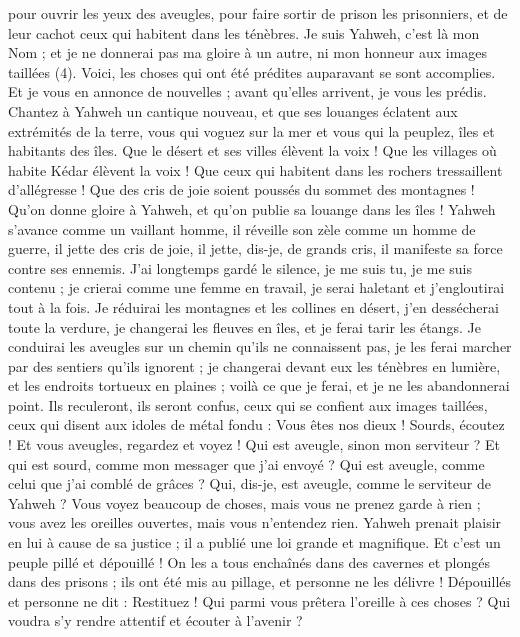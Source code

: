 \begin{multicols}{2}
pour ouvrir les yeux des aveugles, pour faire sortir de prison les prisonniers, et de leur cachot ceux qui habitent dans les ténèbres.
Je suis Yahweh, c'est là mon Nom ; et je ne donnerai pas ma gloire à un autre, ni mon honneur aux images taillées (4).
Voici, les choses qui ont été prédites auparavant se sont accomplies. Et je vous en annonce de nouvelles ; avant qu’elles arrivent, je vous les prédis.
Chantez à Yahweh un cantique nouveau, et que ses louanges éclatent aux extrémités de la terre, vous qui voguez sur la mer et vous qui la peuplez, îles et habitants des îles.
Que le désert et ses villes élèvent la voix ! Que les villages où habite Kédar élèvent la voix ! Que ceux qui habitent dans les rochers tressaillent d’allégresse ! Que des cris de joie soient poussés du sommet des montagnes !
Qu'on donne gloire à Yahweh, et qu'on publie sa louange dans les îles !
Yahweh s’avance comme un vaillant homme, il réveille son zèle comme un homme de guerre, il jette des cris de joie, il jette, dis-je, de grands cris, il manifeste sa force contre ses ennemis.
J’ai longtemps gardé le silence, je me suis tu, je me suis contenu ; je crierai comme une femme en travail, je serai haletant et j'engloutirai tout à la fois.
Je réduirai les montagnes et les collines en désert, j’en dessécherai toute la verdure, je changerai les fleuves en îles, et je ferai tarir les étangs.
Je conduirai les aveugles sur un chemin qu’ils ne connaissent pas, je les ferai marcher par des sentiers qu'ils ignorent ; je changerai devant eux les ténèbres en lumière, et les endroits tortueux en plaines ; voilà ce que je ferai, et je ne les abandonnerai point.
Ils reculeront, ils seront confus, ceux qui se confient aux images taillées, ceux qui disent aux idoles de métal fondu : Vous êtes nos dieux !
Sourds, écoutez ! Et vous aveugles, regardez et voyez !
Qui est aveugle, sinon mon serviteur ? Et qui est sourd, comme mon messager que j'ai envoyé ? Qui est aveugle, comme celui que j'ai comblé de grâces ? Qui, dis-je, est aveugle, comme le serviteur de Yahweh ?
Vous voyez beaucoup de choses, mais vous ne prenez garde à rien ; vous avez les oreilles ouvertes, mais vous n'entendez rien.
Yahweh prenait plaisir en lui à cause de sa justice ; il a publié une loi grande et magnifique.
Et c’est un peuple pillé et dépouillé ! On les a tous enchaînés dans des cavernes et plongés dans des prisons ; ils ont été mis au pillage, et personne ne les délivre ! Dépouillés et personne ne dit : Restituez !
Qui parmi vous prêtera l'oreille à ces choses ? Qui voudra s’y rendre attentif et écouter à l’avenir ?

\end{multicols}
